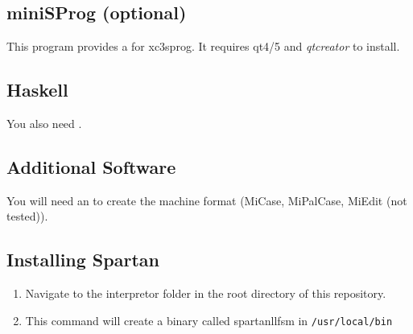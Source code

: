 \documentclass{article}
\begin{document}
            \subsection{miniSProg (optional)}
                This program provides a \GUI\/ for xc3sprog. It requires qt4/5 and \textit{qtcreator} to install.
            \subsection{Haskell}
                You also need \ghc.
            \subsection{Additional \MiPal\/ Software}
                You will need an \IDE\/ to create the machine format (MiCase, MiPalCase, MiEdit (not tested)).
            \subsection{Installing Spartan \LLFSM}
                \begin{enumerate}
                    \item Navigate to the interpretor folder in the root directory of this repository.
                    \item This command will create a binary called spartanllfsm in \texttt{/usr/local/bin}
                \end{enumerate}
\end{document}

